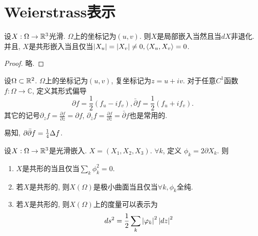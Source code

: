 \section{Weierstrass表示}
\begin{proposition} \label{iff_conformal}
    设$X: \Omega \to \mathbb{R}^3$光滑. $\Omega$上的坐标记为$(u,v)$. 则$X$是局部嵌入当然且当$dX$非退化. 并且, $X$是共形嵌入当且仅当$\left | X_u \right |=\left | X_v \right | \ne 0, {\left < X_u, X_v \right >} =0$.
\end{proposition}
\begin{proof}
    略.
\end{proof}
\begin{definition}
    设$\Omega \subset \mathbb{R}^2$.   $\Omega$上的坐标记为$(u,v)$, 复坐标记为$z=u+iv$. 对于任意$C^1$函数$f: \Omega \to \mathbb{C}$, 定义其形式偏导
    \begin{equation}
        \partial f= \frac{1}{2}(f_u- i f_v), \bar{\partial} f= \frac{1}{2}(f_u+i f_v).
    \end{equation}
    其它的记号$\partial_{z}f=\frac{\partial f}{\partial z} =\partial f$, $\partial_{\bar{z}}f=\frac{\partial f}{\partial \bar{z}} =\bar{\partial} f$也是常用的. 
\end{definition}
\begin{remark}
    易知, $\partial {\bar{\partial}} f= \frac{1}{4}\Delta f$. 
\end{remark}
\begin{proposition} \label{iff_conformal_c}
    设$X: \Omega \to \mathbb{R}^3$是光滑嵌入. $X=(X_1,X_2,X_3)$. $\forall k$, 定义 $\phi_k= 2\partial X_k$. 则
    \begin{enumerate}
        \item $X$是共形的当且仅当$\sum_k \phi_k^2=0$.
        \item 若$X$是共形的, 则$X(\Omega)$是极小曲面当且仅当$\forall k, \phi_k$全纯.
        \item 若$X$是共形的, 则$X(\Omega)$上的度量可以表示为
        \begin{equation}
            ds^2=\frac{1}{2}\sum_k \left | \varphi_k \right |^2 \left | dz \right |^2
        \end{equation}
    \end{enumerate}
\end{proposition}
